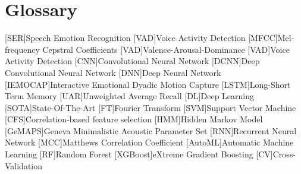 \chapter{Glossary}

\footnotesize
\SingleSpacing

\begin{multicols}{2}
\begin{acronym}[AAAAAA]

    [SER]{Speech Emotion Recognition}
    [VAD]{Voice Activity Detection}
    [MFCC]{Mel-frequency Cepstral Coefficients}
    [VAD]{Valence-Arousal-Dominance}
    [VAD]{Voice Activity Detection}
    [CNN]{Convolutional Neural Network}
    [DCNN]{Deep Convolutional Neural Network}
    [DNN]{Deep Neural Network}
    [IEMOCAP]{Interactive Emotional Dyadic Motion Capture}
    [LSTM]{Long-Short Term Memory}
    [UAR]{Unweighted Average Recall}
    [DL]{Deep Learning}
    [SOTA]{State-Of-The-Art}
    [FT]{Fourier Transform}
    [SVM]{Support Vector Machine}
    [CFS]{Correlation-based feature selection}
    [HMM]{Hidden Markov Model}
    [GeMAPS]{Geneva Minimalistic Acoustic Parameter Set}
    [RNN]{Recurrent Neural Network}
    [MCC]{Matthews Correlation Coefficient}
    [AutoML]{Automatic Machine Learning}
    [RF]{Random Forest}
    [XGBoost]{eXtreme Gradient Boosting}
    [CV]{Cross-Validation}
\end{acronym}
\end{multicols}

